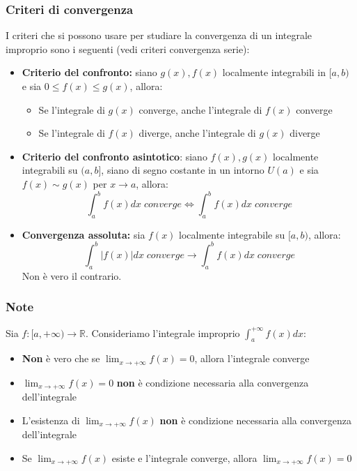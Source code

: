 \documentclass{article}
\newcommand{\R}{\mathds{R}}
\begin{document}
\subsubsection{Criteri di convergenza}
I criteri che si possono usare per studiare la convergenza di un integrale improprio sono i seguenti (vedi criteri convergenza serie):
\begin{itemize}
    \item \textbf{Criterio del confronto:} siano $g(x),f(x)$ localmente integrabili in $[a,b)$ e sia $0\leq f(x)\leq g(x)$, allora:
    \begin{itemize}
        \item Se l'integrale di $g(x)$ converge, anche l'integrale di $f(x)$ converge
        \item Se l'integrale di $f(x)$ diverge, anche l'integrale di $g(x)$ diverge
    \end{itemize}
    
    \item \textbf{Criterio del confronto asintotico}: siano $f(x),g(x)$ localmente integrabili su $(a,b]$, siano di segno costante in un intorno $U(a)$ e sia $f(x)\sim g(x)$ per $x\rightarrow a$, allora:
    $$\int_a^b f(x)dx \; converge \Leftrightarrow \int_a^b f(x)dx \; converge $$
    
    \item \textbf{Convergenza assoluta:} sia $f(x)$ localmente integrabile su $[a,b)$, allora:
    $$\int_a^b |f(x)|dx \; converge \rightarrow \int_a^b f(x)dx \; converge $$
    Non è vero il contrario.
\end{itemize}

\subsubsection{Note}
Sia $f:[a,+\infty)\rightarrow\R$. Consideriamo l'integrale improprio $\int_a^{+\infty}f(x)dx$:
\begin{itemize}
    \item \textbf{Non} è vero che se $\lim_{x\rightarrow +\infty}f(x)=0$, allora l'integrale converge
    \item $\lim_{x\rightarrow +\infty}f(x)=0$ \textbf{non} è condizione necessaria alla convergenza dell'integrale 
    \item L'esistenza di $\lim_{x\rightarrow +\infty}f(x)$ \textbf{non} è condizione necessaria alla convergenza dell'integrale
    \item Se $\lim_{x\rightarrow +\infty}f(x)$ esiste e l'integrale converge, allora $\lim_{x\rightarrow +\infty}f(x)=0$
\end{itemize}
\end{document}
